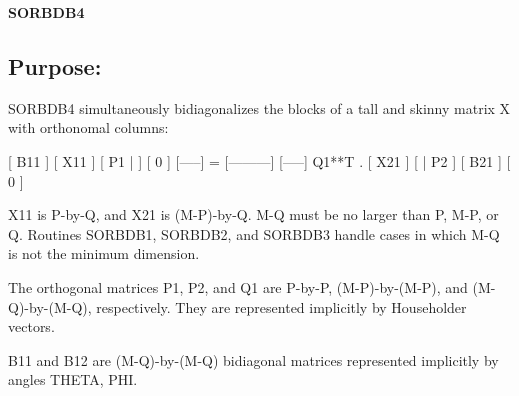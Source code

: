 {\bfseries S\+O\+R\+B\+D\+B4} 

\subsection*{Purpose\+: }

\begin{DoxyVerb} SORBDB4 simultaneously bidiagonalizes the blocks of a tall and skinny
 matrix X with orthonomal columns:

                            [ B11 ]
      [ X11 ]   [ P1 |    ] [  0  ]
      [-----] = [---------] [-----] Q1**T .
      [ X21 ]   [    | P2 ] [ B21 ]
                            [  0  ]

 X11 is P-by-Q, and X21 is (M-P)-by-Q. M-Q must be no larger than P,
 M-P, or Q. Routines SORBDB1, SORBDB2, and SORBDB3 handle cases in
 which M-Q is not the minimum dimension.

 The orthogonal matrices P1, P2, and Q1 are P-by-P, (M-P)-by-(M-P),
 and (M-Q)-by-(M-Q), respectively. They are represented implicitly by
 Householder vectors.

 B11 and B12 are (M-Q)-by-(M-Q) bidiagonal matrices represented
 implicitly by angles THETA, PHI.\end{DoxyVerb}
 
